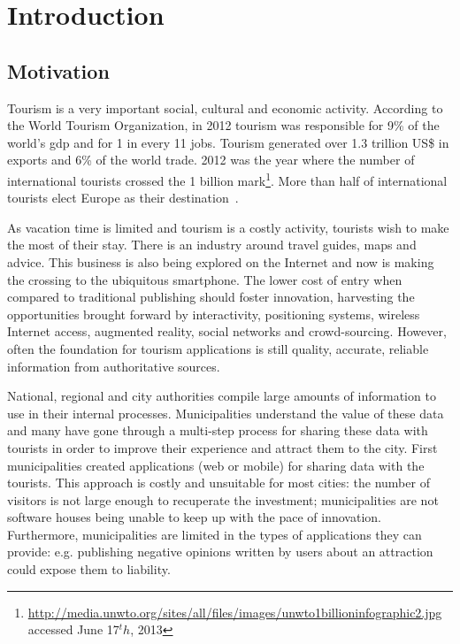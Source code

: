 \documentclass[times]{ettauth}
\begin{document}
\maketitle

\acresetall
\section{Introduction}

\subsection{Motivation}
\label{s:motivation}
Tourism is a very important social, cultural and economic activity.
According to the World Tourism Organization, in 2012 tourism was responsible for 9\% of the world's \ac{gdp} and for 1 in every 11 jobs.
Tourism generated over 1.3 trillion US\$ in exports and 6\% of the world trade.
2012 was the year where the number of international tourists crossed the 1 billion mark\footnote{\url{http://media.unwto.org/sites/all/files/images/unwto1billioninfographic2.jpg} accessed June 17$^th$, 2013}.
More than half of international tourists elect Europe as their destination~\cite{unwto}.

As vacation time is limited and tourism is a costly activity, tourists wish to make the most of their stay.
There is an industry around travel guides, maps and advice.
This business is also being explored on the Internet and now is making the crossing to the ubiquitous smartphone.
The lower cost of entry when compared to traditional publishing should foster innovation, harvesting the opportunities brought forward by interactivity, positioning systems, wireless Internet access, augmented reality, social networks and crowd-sourcing. 
However, often the foundation for tourism applications is still quality, accurate, reliable information from authoritative sources.

National, regional and city authorities compile large amounts of information to use in their internal processes.
Municipalities understand the value of these data and many have gone through a multi-step process for sharing these data with tourists in order to improve their experience and attract them to the city.
First municipalities created applications (web or mobile) for sharing data with the tourists.
This approach is costly and unsuitable for most cities: the number of visitors is not large enough to recuperate the investment; municipalities are not software houses being unable to keep up with the pace of innovation. 
Furthermore, municipalities are limited in the types of applications they can provide: e.g. publishing negative opinions written by users about an attraction could expose them to liability.
\end{document}

